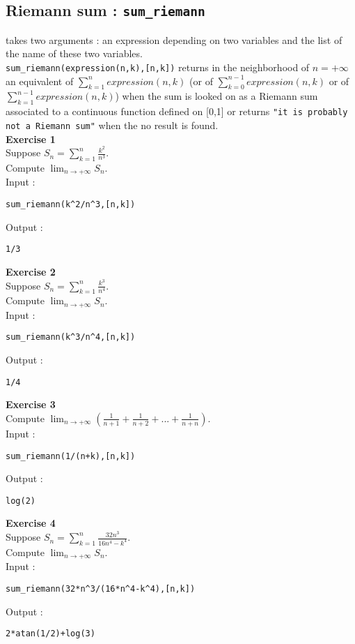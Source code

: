 \documentclass[a4paper,11pt]{book}
\begin{document}
\subsection{Riemann sum : {\tt sum\_riemann}}
 takes two arguments : an expression depending on 
two variables and the list of the name of these two variables.\\ 
{\tt sum\_riemann(expression(n,k),[n,k])} returns in the neighborhood of
 $ n=+\infty$ an equivalent of $\sum_{k=1}^n expression(n,k)$ (or of
$ \sum_{k=0}^{n-1} expression(n,k)$ or of $ \sum_{k=1}^{n-1} expression(n,k)$) 
when the sum is looked on as a Riemann sum associated to a continuous 
function defined on [0,1] or returns  
{\tt "it is probably not a Riemann sum"} when the no result is found.\\
{\bf Exercise 1}\\
Suppose $\displaystyle S_n=\sum_{k=1}^n \frac{k^2}{n^3}$.\\
Compute $\displaystyle \lim_{n \rightarrow  +\infty} S_n$.\\
Input :
\begin{center}{\tt sum\_riemann(k\verb|^|2/n\verb|^|3,[n,k])}\end{center}
Output  :
\begin{center}{\tt 1/3}\end{center}
{\bf Exercise 2}\\
Suppose $\displaystyle S_n=\sum_{k=1}^n \frac{k^3}{n^4}$.\\
Compute $\displaystyle \lim_{n \rightarrow  +\infty} S_n$.\\
Input :
\begin{center}{\tt sum\_riemann(k\verb|^|3/n\verb|^|4,[n,k])}\end{center}
Output  :
\begin{center}{\tt 1/4}\end{center}
{\bf Exercise 3}\\
Compute 
$\displaystyle \lim_{n \rightarrow  +\infty}(\frac{1}{n+1}+\frac{1}{n+2}+...+\frac{1}{n+n})$.\\
Input :
\begin{center}{\tt sum\_riemann(1/(n+k),[n,k])}\end{center}
Output :
\begin{center}{\tt log(2)}\end{center}
{\bf Exercise 4}\\
Suppose $\displaystyle S_n=\sum_{k=1}^n \frac{32n^3}{16n^4-k^4}$.\\
Compute $\displaystyle \lim_{n \rightarrow  +\infty} S_n$.\\
Input :
\begin{center}{\tt sum\_riemann(32*n\verb|^|3/(16*n\verb|^|4-k\verb|^|4),[n,k])}\end{center}
Output :
\begin{center}{\tt 2*atan(1/2)+log(3)}\end{center}
\end{document}
